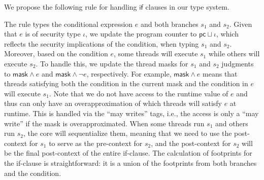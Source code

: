 We propose the following rule for handling $\mathsf{if}$ clauses in our type system. 
{\small\begin{mathpar}
    \end{mathpar}
    }
    The rule types the conditional expression $e$ and both branches $s_1$ and $s_2$. Given that $e$ is of security type $\iota$, we update the program counter to $\mathsf{pc} \sqcup \iota$, which reflects the security implications of the condition,  when typing $s_1$ and $s_2$. 
 Moreover, based on the condition $e$, some threads will execute $s_1$ while others will execute $s_2$. 
 To handle this, we update the thread masks for $s_1$ and $s_2$ judgments to $\mathsf{mask} \wedge e$ and $\mathsf{mask} \wedge \neg e$, respectively.
 For example,  $\mathsf{mask} \wedge e$ means that threads satisfying both the condition in the current mask and the condition in $e$ will execute $s_1$. 
 Note that we do not have access to the runtime value of $e$ and thus can only have an overapproximation of which threads will satisfy $e$ at runtime. This is handled via the ``may writes'' tags, i.e., the access is only a ``may write'' if the mask is overapproximated.
%
When some threads run $s_1$ and others run $s_2$, the core will sequentialize them, meaning that we need to use the post-context for $s_1$ to serve as the pre-context for $s_2$, and the post-context for $s_2$ will be the final post-context of the entire if-clause.
%
The calculation of footprints for the if-clause is straightforward: it is a union of the footprints from both branches and the condition.
  

